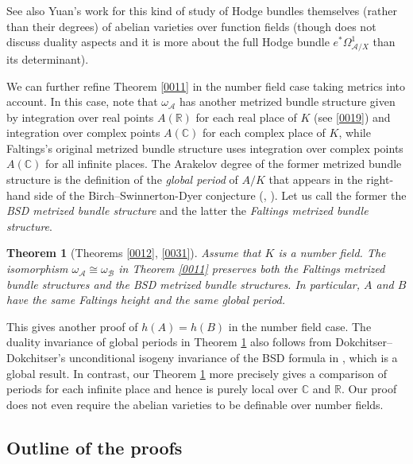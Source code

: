 \documentclass{amsart}
\newtheorem{theorem}{Theorem}[section]
\theoremstyle{remark}
\numberwithin{equation}{section}
\newcommand{\R}{\mathbb{R}}
\newcommand{\C}{\mathbb{C}}
\begin{document}
See also Yuan's work \cite{Yua21} for this kind of study
of Hodge bundles themselves (rather than their degrees)
of abelian varieties over function fields
(though \cite{Yua21} does not discuss duality aspects
and it is more about the full Hodge bundle
$e^{\ast} \Omega^{1}_{\mathcal{A} / X}$
than its determinant).

We can further refine Theorem \ref{0011} in the number field case
taking metrics into account.
In this case, note that
$\omega_{\mathcal{A}}$ has another metrized bundle structure
given by integration over real points $A(\R)$
for each real place of $K$ (see \eqref{0019})
and integration over complex points $A(\C)$
for each complex place of $K$,
while Faltings's original metrized bundle structure uses
integration over complex points $A(\C)$
for all infinite places.
The Arakelov degree of the former metrized bundle structure is
the definition of the \emph{global period} of $A / K$
that appears in the right-hand side of the Birch--Swinnerton-Dyer conjecture
(\cite[Conjecture 2.1 (2)]{DD10}, \cite[Definition 2.1]{DD15}).
Let us call the former the \emph{BSD metrized bundle structure}
and the latter the \emph{Faltings metrized bundle structure}.

\begin{theorem}[Theorems \ref{0012}, \ref{0031}] \label{0029}
	Assume that $K$ is a number field.
	The isomorphism
	$\omega_{\mathcal{A}} \cong \omega_{\mathcal{B}}$
	in Theorem \ref{0011}
	preserves both the Faltings metrized bundle structures
	and the BSD metrized bundle structures.
	In particular, $A$ and $B$ have the same Faltings height
	and the same global period.
\end{theorem}

This gives another proof of $h(A) = h(B)$ in the number field case.
The duality invariance of global periods in Theorem \ref{0029} also follows from
Dokchitser--Dokchitser's unconditional isogeny invariance
of the BSD formula in \cite[Theorem 4.3]{DD10},
which is a global result.
In contrast, our Theorem \ref{0029} more precisely gives a comparison of periods
for each infinite place
and hence is purely local over $\C$ and $\R$.
Our proof does not even require the abelian varieties
to be definable over number fields.


\subsection{Outline of the proofs}
\end{document}
